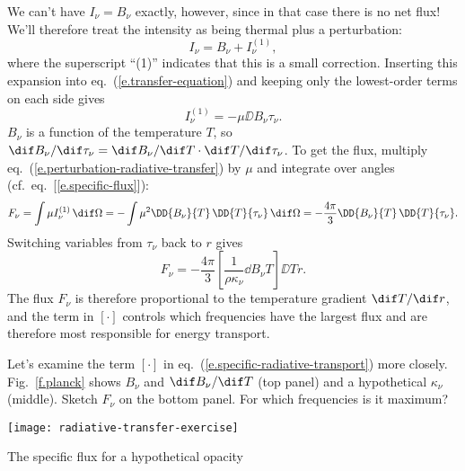 We can't have $I_{\nu} = B_{\nu}$ exactly, however, since in that case there is no net flux! We'll therefore treat the intensity as being thermal plus a perturbation:
\[ I_{\nu} = B_{\nu} + I_{\nu}^{(1)}, \]
where the superscript ``(1)'' indicates that this is a small correction. Inserting this expansion into eq.~(\ref{e.transfer-equation}) and keeping only the lowest-order terms on each side gives
\begin{equation}\label{e.perturbation-radiative-transfer}
I_{\nu}^{(1)} = -\mu\DD{B_{\nu}}{\tau_{\nu}}.
\end{equation}
$B_{\nu}$ is a function of the temperature $T$, so $\dif B_{\nu}/\dif\tau_{\nu} = \dif B_{\nu}/\dif T \cdot \dif T/\dif \tau_{\nu}$. To get the flux, multiply eq.~(\ref{e.perturbation-radiative-transfer}) by $\mu$ and integrate over angles (cf.\ eq.~[\ref{e.specific-flux}]):
\[ F_{\nu} = \int\mu I_{\nu}^{(1)}\,\dif\Omega = -\int \mu^{2}\DD{B_{\nu}}{T}\,\DD{T}{\tau_{\nu}}\,\dif \Omega = -\frac{4\pi}{3} \DD{B_{\nu}}{T}\,\DD{T}{\tau_{\nu}}. \]
Switching variables from $\tau_{\nu}$ back to $r$ gives
\begin{equation}\label{e.specific-radiative-transport}
	F_{\nu} = -\frac{4\pi}{3}\left[\frac{1}{\rho\kappa_{\nu}}\dd{B_{\nu}}{T}\right]\DD{T}{r}.
\end{equation}
The flux $F_{\nu}$ is therefore proportional to the temperature gradient $\dif T/\dif r$, and
the term in $\left[\cdot\right]$ controls which frequencies have the largest flux and are therefore most responsible for energy transport.

\begin{exercisebox}
\label{ex.radiative-transfer}
Let's examine the term $\left[\cdot\right]$ in eq.~(\ref{e.specific-radiative-transport}) more closely. Fig.~\ref{f.planck} shows $B_{\nu}$ and $\dif B_{\nu}/\dif T$ (top panel) and a hypothetical $\kappa_{\nu}$ (middle). Sketch $F_{\nu}$ on the bottom panel.  For which frequencies is it maximum?
\end{exercisebox}

\begin{marginfigure}
\texttt{[image: radiative-transfer-exercise]}
\caption{\label{f.planck} The specific flux for a hypothetical opacity}
\end{marginfigure}


